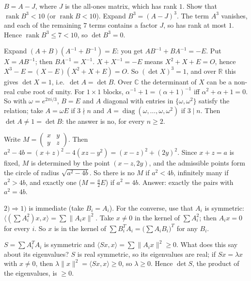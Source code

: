 \documentclass[11pt,a4paper]{article}
\begin{document}

\(B=A-J\), where \(J\) is the all-ones matrix, which has rank \(1\). Show that \(\operatorname{rank}B^3\lt 10\) (or \(\operatorname{rank} B\lt 10\)).
Expand \(B^3=(A-J)^3\). The term \(A^3\) vanishes, and each of the remaining \(7\) terms contains a factor \(J\), so has rank at most \(1\). Hence \(\operatorname{rank}B^3\le 7\lt 10\), so \(\det B^3=0\).

Expand \((A+B)(A^{-1}+B^{-1})=E\): you get \(AB^{-1}+BA^{-1}=-E\). Put \(X=AB^{-1}\); then \(BA^{-1}=X^{-1}\).
\(X+X^{-1}=-E\) means \(X^2+X+E=O\), hence \(X^3-E=(X-E)(X^2+X+E)=O\). So \((\det X)^3=1\), and over \(\mathbb R\) this gives \(\det X=1\), i.e.\ \(\det A=\det B\).
Over \(\mathbb C\) the determinant of \(X\) can be a non-real cube root of unity. For \(1\times1\) blocks, \(\alpha^{-1}+1=(\alpha+1)^{-1}\) iff \(\alpha^2+\alpha+1=0\). So with \(\omega=e^{2\pi i/3}\), \(B=E\) and \(A\) diagonal with entries in \(\{\omega,\omega^2\}\) satisfy the relation; take \(A=\omega E\) if \(3\nmid n\) and \(A=\operatorname{diag}(\omega,\dots,\omega,\omega^2)\) if \(3\mid n\). Then \(\det A\ne1=\det B\): the answer is no, for every \(n\ge2\).

Write \(M=\begin{pmatrix}x&y\\y&z\end{pmatrix}\). Then \(a^2-4b=(x+z)^2-4(xz-y^2)=(x-z)^2+(2y)^2\).
Since \(x+z=a\) is fixed, \(M\) is determined by the point \((x-z,2y)\), and the admissible points form the circle of radius \(\sqrt{a^2-4b}\). So there is no \(M\) if \(a^2\lt4b\), infinitely many if \(a^2\gt4b\), and exactly one (\(M=\tfrac a2E\)) if \(a^2=4b\). Answer: exactly the pairs with \(a^2=4b\).

\(2)\Rightarrow1)\) is immediate (take \(B_i=A_i\)). For the converse, use that \(A_i\) is symmetric: \(\langle(\sum A_i^2)x,x\rangle=\sum\lVert A_ix\rVert^2\).
Take \(x\ne0\) in the kernel of \(\sum A_i^2\); then \(A_ix=0\) for every \(i\). So \(x\) is in the kernel of \(\sum B_i^TA_i=\bigl(\sum A_iB_i\bigr)^T\) for any \(B_i\).

\(S=\sum A_i^TA_i\) is symmetric and \(\langle Sx,x\rangle=\sum\lVert A_ix\rVert^2\ge0\). What does this say about its eigenvalues?
\(S\) is real symmetric, so its eigenvalues are real; if \(Sx=\lambda x\) with \(x\ne0\), then \(\lambda\lVert x\rVert^2=\langle Sx,x\rangle\ge0\), so \(\lambda\ge0\). Hence \(\det S\), the product of the eigenvalues, is \(\ge0\).
\end{document}
